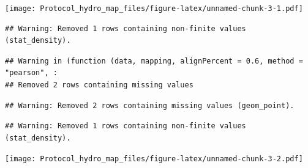 \documentclass[]{article}
\newenvironment{Shaded}{\begin{snugshade}}{\end{snugshade}}
\newcommand{\KeywordTok}[1]{\textcolor[rgb]{0.13,0.29,0.53}{\textbf{#1}}}
\newcommand{\DataTypeTok}[1]{\textcolor[rgb]{0.13,0.29,0.53}{#1}}
\newcommand{\StringTok}[1]{\textcolor[rgb]{0.31,0.60,0.02}{#1}}
\newcommand{\OperatorTok}[1]{\textcolor[rgb]{0.81,0.36,0.00}{\textbf{#1}}}
\newcommand{\NormalTok}[1]{#1}
\begin{document}
\texttt{[image: Protocol\_hydro\_map\_files/figure-latex/unnamed-chunk-3-1.pdf]}

\begin{Shaded}
\end{Shaded}

\begin{verbatim}
## Warning: Removed 1 rows containing non-finite values (stat_density).
\end{verbatim}

\begin{verbatim}
## Warning in (function (data, mapping, alignPercent = 0.6, method = "pearson", :
## Removed 2 rows containing missing values
\end{verbatim}

\begin{verbatim}
## Warning: Removed 2 rows containing missing values (geom_point).
\end{verbatim}

\begin{verbatim}
## Warning: Removed 1 rows containing non-finite values (stat_density).
\end{verbatim}

\texttt{[image: Protocol\_hydro\_map\_files/figure-latex/unnamed-chunk-3-2.pdf]}

\begin{Shaded}
\end{Shaded}
\end{document}
